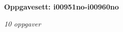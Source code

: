\centerline{\bf Oppgavesett: i00951no-i00960no}
\vskip 10pt
\centerline{\it 10 oppgaver}\vskip 10pt
\vskip 10pt
